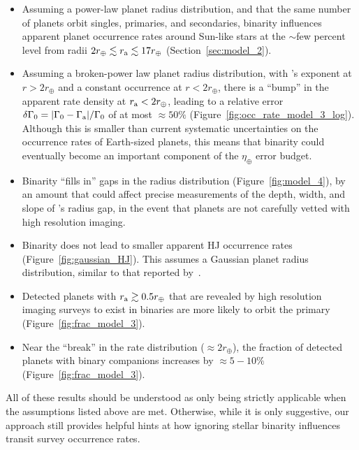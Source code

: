 \documentclass[12pt,modern]{aastex61}
\renewcommand{\a}{_{\rm a}}
\begin{document}
\begin{itemize}
%
\item Assuming a power-law planet radius distribution, and that the same 
number of planets orbit singles, primaries, and secondaries, binarity 
influences apparent planet occurrence rates around Sun-like stars at the 
$\sim$few percent level from radii $2r_\oplus \lesssim r\a \lesssim 
17r_\oplus$ (Section~\ref{sec:model_2}).
%
\item Assuming a broken-power law planet radius distribution, with 
\citet{howard_planet_2012}'s exponent at $r > 2r_\oplus$ and a constant 
occurrence at $r < 2r_\oplus$, there is a ``bump'' in the apparent rate 
density at $r\a < 2r_\oplus$, leading to a relative error $\delta \Gamma_0 = 
|\Gamma_0 - \Gamma\a|/\Gamma_0$ of at most $\approx 50\%$ 
(Figure~\ref{fig:occ_rate_model_3_log}).
Although this is smaller than current systematic uncertainties on the 
occurrence rates of Earth-sized planets, this means that binarity could
eventually become an important component of the $\eta_\oplus$ error budget.
%
\item Binarity ``fills in'' gaps in the radius distribution 
(Figure~\ref{fig:model_4}), by an amount that could affect precise 
measurements 
of the depth, width, and slope of \citet{fulton_california-_2017}'s radius 
gap, in the event that planets are not carefully vetted with high resolution 
imaging.
%
\item Binarity does not lead to smaller apparent HJ occurrence rates 
(Figure~\ref{fig:gaussian_HJ}).
This assumes a Gaussian planet radius distribution, similar to that reported 
by~\citet{petigura_CKS_2017}.
%
\item Detected planets with $r\a \gtrsim 0.5r_\oplus$ that are revealed by 
high resolution imaging surveys to exist in binaries are more likely to orbit 
the primary (Figure~\ref{fig:frac_model_3}).
%
\item Near the ``break'' in the rate distribution ($\approx 2r_\oplus$), 
the fraction of detected planets with binary companions increases by 
$\approx 5-10\%$ (Figure~\ref{fig:frac_model_3}).
\end{itemize}

All of these results should be understood as only being strictly applicable 
when the assumptions listed above are met.
Otherwise, while it is only suggestive, our approach still provides 
helpful hints at how ignoring stellar binarity influences transit survey
occurrence rates.
\end{document}
